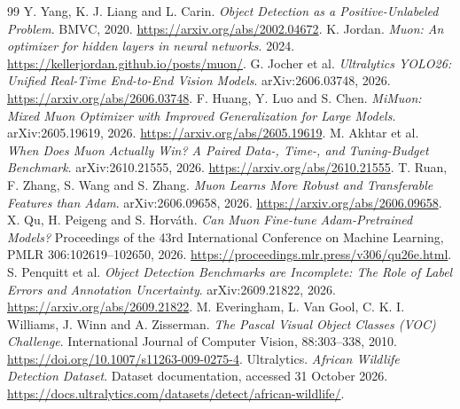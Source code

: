 \documentclass[11pt,a4paper]{article}
\begin{document}
\begin{thebibliography}{99}
 Y. Yang, K. J. Liang and L. Carin. \emph{Object Detection as a Positive-Unlabeled Problem}. BMVC, 2020. \url{https://arxiv.org/abs/2002.04672}.
 K. Jordan. \emph{Muon: An optimizer for hidden layers in neural networks}. 2024. \url{https://kellerjordan.github.io/posts/muon/}.
 G. Jocher et al. \emph{Ultralytics YOLO26: Unified Real-Time End-to-End Vision Models}. arXiv:2606.03748, 2026. \url{https://arxiv.org/abs/2606.03748}.
 F. Huang, Y. Luo and S. Chen. \emph{MiMuon: Mixed Muon Optimizer with Improved Generalization for Large Models}. arXiv:2605.19619, 2026. \url{https://arxiv.org/abs/2605.19619}.
 M. Akhtar et al. \emph{When Does Muon Actually Win? A Paired Data-, Time-, and Tuning-Budget Benchmark}. arXiv:2610.21555, 2026. \url{https://arxiv.org/abs/2610.21555}.
 T. Ruan, F. Zhang, S. Wang and S. Zhang. \emph{Muon Learns More Robust and Transferable Features than Adam}. arXiv:2606.09658, 2026. \url{https://arxiv.org/abs/2606.09658}.
 X. Qu, H. Peigeng and S. Horv\'ath. \emph{Can Muon Fine-tune Adam-Pretrained Models?} Proceedings of the 43rd International Conference on Machine Learning, PMLR 306:102619--102650, 2026. \url{https://proceedings.mlr.press/v306/qu26e.html}.
 S. Penquitt et al. \emph{Object Detection Benchmarks are Incomplete: The Role of Label Errors and Annotation Uncertainty}. arXiv:2609.21822, 2026. \url{https://arxiv.org/abs/2609.21822}.
 M. Everingham, L. Van Gool, C. K. I. Williams, J. Winn and A. Zisserman. \emph{The Pascal Visual Object Classes (VOC) Challenge}. International Journal of Computer Vision, 88:303--338, 2010. \url{https://doi.org/10.1007/s11263-009-0275-4}.
 Ultralytics. \emph{African Wildlife Detection Dataset}. Dataset documentation, accessed 31 October 2026. \url{https://docs.ultralytics.com/datasets/detect/african-wildlife/}.
\end{thebibliography}
\end{document}
